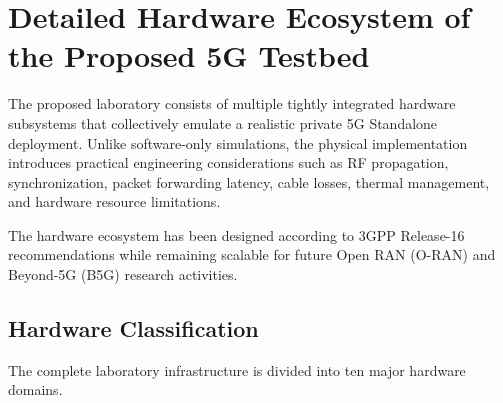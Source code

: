 \documentclass[12pt,a4paper]{article}\usepackage[a4paper,margin=1in]{geometry}\usepackage{graphicx}\usepackage{longtable}\usepackage{booktabs}\usepackage{hyperref}\usepackage{enumitem}\usepackage{amsmath}\usepackage{tikz}\usepackage{pgfgantt}\usepackage{setspace}\setstretch{1.15}\usetikzlibrary{positioning,arrows.meta,shapes.geometric}
\begin{document}
	\section{Detailed Hardware Ecosystem of the Proposed 5G Testbed}
	
	The proposed laboratory consists of multiple tightly integrated hardware subsystems that collectively emulate a realistic private 5G Standalone deployment. Unlike software-only simulations, the physical implementation introduces practical engineering considerations such as RF propagation, synchronization, packet forwarding latency, cable losses, thermal management, and hardware resource limitations.
	
	The hardware ecosystem has been designed according to 3GPP Release-16 recommendations while remaining scalable for future Open RAN (O-RAN) and Beyond-5G (B5G) research activities.
	
	
	\subsection{Hardware Classification}
	
	The complete laboratory infrastructure is divided into ten major hardware domains.
	
\end{document}
